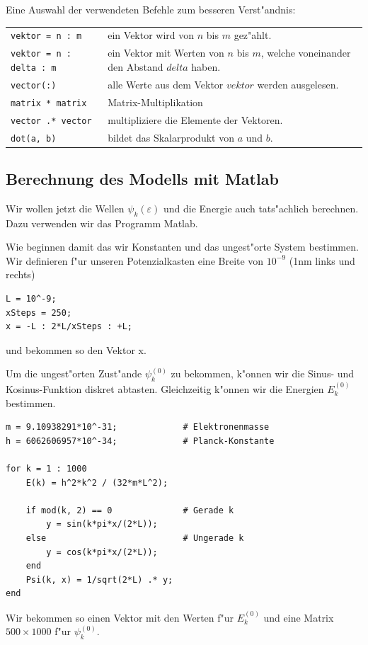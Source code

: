 \begin{refsection}
Eine Auswahl der verwendeten Befehle zum besseren Verst"andnis:

\begin{center}
	\begin{tabular}{lp{9cm}}
		\verb|vektor = n : m| & ein Vektor wird von $n$ bis $m$ gez"ahlt. \\
		\verb|vektor = n : delta : m| & ein Vektor mit Werten von $n$ bis $m$, welche voneinander den Abstand $delta$ haben. \\
		\verb|vector(:)| & alle Werte aus dem Vektor $vektor$ werden ausgelesen. \\
		\verb|matrix * matrix| & Matrix-Multiplikation \\
		\verb|vector .* vector| & multipliziere die Elemente der Vektoren. \\
		\verb|dot(a, b)| & bildet das Skalarprodukt von $a$ und $b$.
	\end{tabular}
\end{center}




\subsection{Berechnung des Modells mit Matlab}

Wir wollen jetzt die Wellen $\psi_k(\varepsilon)$ und die Energie auch tats"achlich berechnen.
Dazu verwenden wir das Programm Matlab.

Wie beginnen damit das wir Konstanten und das ungest"orte System bestimmen.
Wir definieren f"ur unseren Potenzialkasten eine Breite von $10^{-9}$ (1nm links und rechts)
\begin{lstlisting}[style=Matlab]
L = 10^-9;
xSteps = 250;
x = -L : 2*L/xSteps : +L;
\end{lstlisting}
und bekommen so den Vektor x.

Um die ungest"orten Zust"ande $\psi_k^{(0)}$ zu bekommen, k"onnen wir die Sinus- und Kosinus-Funktion diskret abtasten.
Gleichzeitig k"onnen wir die Energien $E_k^{(0)}$ bestimmen.
\begin{lstlisting}[style=Matlab]
m = 9.10938291*10^-31;             # Elektronenmasse
h = 6062606957*10^-34;             # Planck-Konstante

for k = 1 : 1000
    E(k) = h^2*k^2 / (32*m*L^2);
    
    if mod(k, 2) == 0              # Gerade k
        y = sin(k*pi*x/(2*L));
    else                           # Ungerade k
        y = cos(k*pi*x/(2*L));
    end
    Psi(k, x) = 1/sqrt(2*L) .* y;
end
\end{lstlisting}
Wir bekommen so einen Vektor mit den Werten f"ur $E_k^{(0)}$
und eine Matrix $500 \times 1000$ f"ur $\psi_k^{(0)}$.


\end{refsection}

